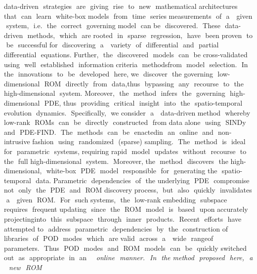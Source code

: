 \documentclass{article}
\begin{document}
data-driven​ ​ strategies​ ​ are​ ​ giving​ ​ rise​ ​ to​ ​ new​ ​ mathematical​ ​ architectures​ ​ that​ ​ can​ ​ learn​ ​ white-box
models​ ​ from​ ​ time​ ​ series​ ​ measurements​ ​ of​ ​ a ​ ​ given​ ​ system,​ ​ i.e.​ ​ the​ ​ correct​ ​ governing​ ​ model​ ​ can
be​ ​ discovered.​ ​ These​ ​ data-driven​ ​ methods,​ ​ which​ ​ are​ ​ rooted​ ​ in​ ​ sparse​ ​ regression,​ ​ have​ ​ been
proven​ ​ to​ ​ be​ ​ successful​ ​ for​ ​ discovering​ ​ a ​ ​ variety​ ​ of​ ​ differential​ ​ and​ ​ partial​ ​ differential​ ​ equations.
Further,​ ​ the​ ​ discovered​ ​ models​ ​ can​ ​ be​ ​ cross-validated​ ​ using​ ​ well​ ​ established​ ​ information
criteria​ ​ methods​ ​ from​ ​ model​ ​ selection.​ ​ In​ ​ the​ ​ innovations​ ​ to​ ​ be​ ​ developed​ ​ here,​ ​ we​ ​ discover​ ​ the
governing​ ​ low-dimensional​ ​ ROM​ ​ directly​ ​ from​ ​ data,​ ​ thus​ ​ bypassing​ ​ any​ ​ recourse​ ​ to​ ​ the
high-dimensional​ ​ system.​ ​ Moreover,​ ​ the​ ​ method​ ​ infers​ ​ the​ ​ governing​ ​ high-dimensional​ ​ PDE,
thus​ ​ providing​ ​ critical​ ​ insight​ ​ into​ ​ the​ ​ spatio-temporal​ ​ evolution​ ​ dynamics.​ ​ Specifically,​ ​ we
consider​ ​ a ​ ​ data-driven​ ​ method​ ​ whereby​ ​ low-rank​ ​ ROMs​ ​ can​ ​ be​ ​ directly​ ​ constructed​ ​ from​ ​ data
alone​ ​ using​ ​ SINDy​ ​ and​ ​ PDE-FIND.​ ​ The​ ​ methods​ ​ can​ ​ be​ ​ enacted​ ​ in​ ​ an​ ​ online​ ​ and​ ​ non-intrusive
fashion​ ​ using​ ​ randomized​ ​ (sparse)​ ​ sampling.​ ​ The​ ​ method​ ​ is​ ​ ideal​ ​ for​ ​ parametric​ ​ systems,
requiring​ ​ rapid​ ​ model​ ​ updates​ ​ without​ ​ recourse​ ​ to​ ​ the​ ​ full​ ​ high-dimensional​ ​ system.​ ​ Moreover,
the​ ​ method​ ​ discovers​ ​ the​ ​ high-dimensional,​ ​ white-box​ ​ PDE​ ​ model​ ​ responsible​ ​ for​ ​ generating
the​ ​ spatio-temporal​ ​ data.
Parametric​ ​ dependencies​ ​ of​ ​ the​ ​ underlying​ ​ PDE​ ​ compromise​ ​ not​ ​ only​ ​ the​ ​ PDE​ ​ and​ ​ ROM
discovery​ ​ process,​ ​ but​ ​ also​ ​ quickly​ ​ invalidates​ ​ a ​ ​ given​ ​ ROM.​ ​ For​ ​ such​ ​ systems,​ ​ the​ ​ low-rank
embedding​ ​ subspace​ ​ ​ ​ requires​ ​ frequent​ ​ updating​ ​ since​ ​ the​ ​ ROM​ ​ model​ ​ is​ ​ based​ ​ upon
accurately​ ​ projecting​ ​ into​ ​ this​ ​ subspace​ ​ through​ ​ inner​ ​ products.​ ​ Recent​ ​ efforts​ ​ have​ ​ attempted
to​ ​ address​ ​ parametric​ ​ dependencies​ ​ by​ ​ the​ ​ construction​ ​ of​ ​ libraries​ ​ of​ ​ POD​ ​ modes​ ​ which​ ​ are
valid​ ​ across​ ​ a ​ ​ wide​ ​ range​ ​ of​ ​ parameters.​ ​ Thus​ ​ POD​ ​ modes​ ​ and​ ​ ROM​ ​ models​ ​ can​ ​ be​ ​ quickly
switched​ ​ out​ ​ as​ ​ appropriate​ ​ in​ ​ an​ ​ \em​ ​ online​ ​ manner.​ ​ In​ ​ the​ ​ method​ ​ proposed​ ​ here,​ ​ a ​ ​ new​ ​ ROM
\end{document}
